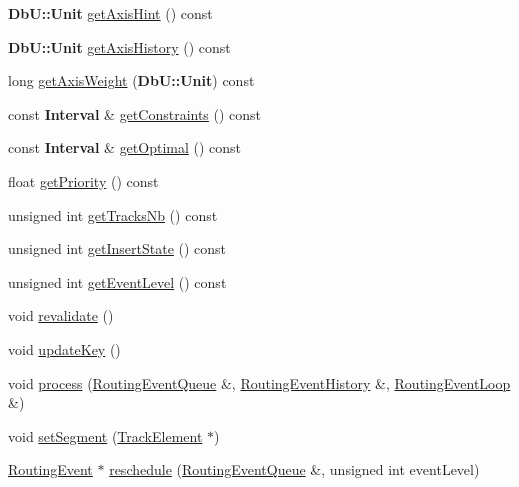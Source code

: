 \begin{DoxyCompactItemize}
\item 
{\bf Db\-U\-::\-Unit} \hyperlink{classKite_1_1RoutingEvent_a2c1fad09850594872cf9e0f017f8034c}{get\-Axis\-Hint} () const 
\item 
{\bf Db\-U\-::\-Unit} \hyperlink{classKite_1_1RoutingEvent_a0d42d996a3a3d013f775949296513428}{get\-Axis\-History} () const 
\item 
long \hyperlink{classKite_1_1RoutingEvent_ab1d579993140867de7226e94049047ed}{get\-Axis\-Weight} ({\bf Db\-U\-::\-Unit}) const 
\item 
const {\bf Interval} \& \hyperlink{classKite_1_1RoutingEvent_a0414e4b8e60741abb6ac0180ed2aba35}{get\-Constraints} () const 
\item 
const {\bf Interval} \& \hyperlink{classKite_1_1RoutingEvent_a652d013f5e2df77c83fb0fcf00f1b6d2}{get\-Optimal} () const 
\item 
float \hyperlink{classKite_1_1RoutingEvent_aeb59bdd62b3cfdb9691fc65ec888335a}{get\-Priority} () const 
\item 
unsigned int \hyperlink{classKite_1_1RoutingEvent_aff63485acfcd4f98a036508264b6b14e}{get\-Tracks\-Nb} () const 
\item 
unsigned int \hyperlink{classKite_1_1RoutingEvent_ae3c7f769774daa40e1678637037b502c}{get\-Insert\-State} () const 
\item 
unsigned int \hyperlink{classKite_1_1RoutingEvent_a632af4915847b1e60ba922422d19f0b5}{get\-Event\-Level} () const 
\item 
void \hyperlink{classKite_1_1RoutingEvent_a5bd93abe1416952ace15a98dbeeed124}{revalidate} ()
\item 
void \hyperlink{classKite_1_1RoutingEvent_a14468bece068cbc5221f057226ee8955}{update\-Key} ()
\item 
void \hyperlink{classKite_1_1RoutingEvent_a6add4f520081c698421481bf8fe0ad1f}{process} (\hyperlink{classKite_1_1RoutingEventQueue}{Routing\-Event\-Queue} \&, \hyperlink{classKite_1_1RoutingEventHistory}{Routing\-Event\-History} \&, \hyperlink{classKite_1_1RoutingEventLoop}{Routing\-Event\-Loop} \&)
\item 
void \hyperlink{classKite_1_1RoutingEvent_ae2eddb4497661b6319616a70c4acd165}{set\-Segment} (\hyperlink{classKite_1_1TrackElement}{Track\-Element} $\ast$)
\item 
\hyperlink{classKite_1_1RoutingEvent}{Routing\-Event} $\ast$ \hyperlink{classKite_1_1RoutingEvent_abf2d02f18f96183fc6e78f3e6dc8cbf6}{reschedule} (\hyperlink{classKite_1_1RoutingEventQueue}{Routing\-Event\-Queue} \&, unsigned int event\-Level)
\item 

\end{DoxyCompactItemize}
